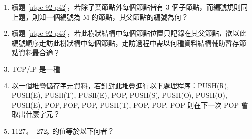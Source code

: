 \documentclass[12pt,a4paper]{report}
\begin{document}
\begin{CJK}{UTF8}{bkai}
\begin{enumerate}
\item \label{ntpc-92-p43} 續題 \ref{ntpc-92-p42}，若除了葉節點外每個節點皆有 3 個子節點，而編號規則同上題，則知一個編號為 M 的節點，其父節點的編號為何？
\item 續題 \ref{ntpc-92-p43}，若此樹狀結構中每個節點位置只記錄在其父節點，欲以此編號順序走訪此樹狀構中每個節點，走訪過程中需以何種資料結構輔助暫存節點資料最合適？
\item TCP/IP 是一種
\item 以一個堆疊儲存字元資料，若針對此堆疊進行以下處理程序：PUSH(R), PUSH(E), PUSH(T), PUSH(E), POP, PUSH(S), PUSH(O), PUSH(O), PUSH(E), POP, POP, POP, PUSH(T), POP, POP, POP 則在下一次 POP 會取出什麼字元？
\item ${1127}_{8}-{272}_{8}$ 的值等於以下何者？
\end{enumerate}
\end{CJK}
\end{document}
